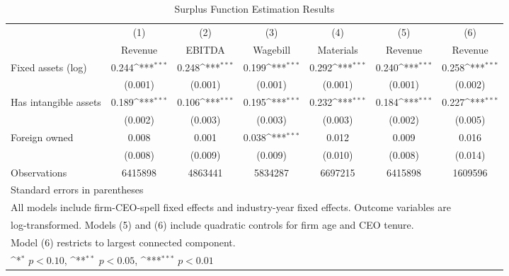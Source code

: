 \begin{table}[htbp]\centering
\def\sym#1{\ifmmode^{#1}\else\(^{#1}\)\fi}
\caption{Surplus Function Estimation Results}
\begin{tabular}{l*{6}{c}}
\toprule
                    &\multicolumn{1}{c}{(1)}&\multicolumn{1}{c}{(2)}&\multicolumn{1}{c}{(3)}&\multicolumn{1}{c}{(4)}&\multicolumn{1}{c}{(5)}&\multicolumn{1}{c}{(6)}\\
                    &\multicolumn{1}{c}{Revenue}&\multicolumn{1}{c}{EBITDA}&\multicolumn{1}{c}{Wagebill}&\multicolumn{1}{c}{Materials}&\multicolumn{1}{c}{Revenue}&\multicolumn{1}{c}{Revenue}\\
\midrule
Fixed assets (log)  &       0.244\sym{***}&       0.248\sym{***}&       0.199\sym{***}&       0.292\sym{***}&       0.240\sym{***}&       0.258\sym{***}\\
                    &     (0.001)         &     (0.001)         &     (0.001)         &     (0.001)         &     (0.001)         &     (0.002)         \\
\addlinespace
Has intangible assets&       0.189\sym{***}&       0.106\sym{***}&       0.195\sym{***}&       0.232\sym{***}&       0.184\sym{***}&       0.227\sym{***}\\
                    &     (0.002)         &     (0.003)         &     (0.003)         &     (0.003)         &     (0.002)         &     (0.005)         \\
\addlinespace
Foreign owned       &       0.008         &       0.001         &       0.038\sym{***}&       0.012         &       0.009         &       0.016         \\
                    &     (0.008)         &     (0.009)         &     (0.009)         &     (0.010)         &     (0.008)         &     (0.014)         \\
\midrule
Observations        &     6415898         &     4863441         &     5834287         &     6697215         &     6415898         &     1609596         \\
\bottomrule
\multicolumn{7}{l}{\footnotesize Standard errors in parentheses}\\
\multicolumn{7}{l}{\footnotesize All models include firm-CEO-spell fixed effects and industry-year fixed effects. Outcome variables are}\\
\multicolumn{7}{l}{\footnotesize log-transformed. Models (5) and (6) include quadratic controls for firm age and CEO tenure.}\\
\multicolumn{7}{l}{\footnotesize Model (6) restricts to largest connected component.}\\
\multicolumn{7}{l}{\footnotesize \sym{*} \(p<0.10\), \sym{**} \(p<0.05\), \sym{***} \(p<0.01\)}\\
\end{tabular}
\end{table}
